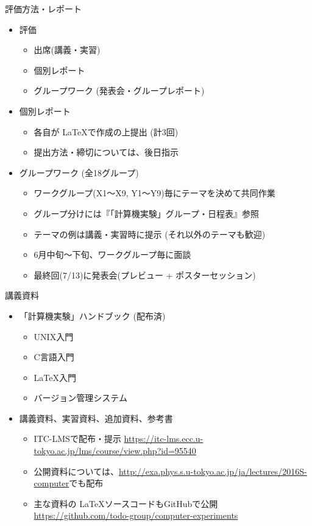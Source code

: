 \documentclass[dvipdfmx]{beamer}
\begin{document}
\begin{frame}[t,fragile]{評価方法・レポート}
  \begin{itemize}
  \item 評価
    \begin{itemize}
    \item 出席(講義・実習)
    \item 個別レポート
    \item グループワーク (発表会・グループレポート)
    \end{itemize}    
  \item 個別レポート
    \begin{itemize}
    \item 各自が \LaTeX で作成の上提出 (計3回)
    \item 提出方法・締切については、後日指示
    \end{itemize}
  \item グループワーク (全18グループ)
    \begin{itemize}
    \item ワークグループ(X1〜X9, Y1〜Y9)毎にテーマを決めて共同作業
    \item グループ分けには『「計算機実験」グループ・日程表』参照
    \item テーマの例は講義・実習時に提示 (それ以外のテーマも歓迎)
    \item 6月中旬〜下旬、ワークグループ毎に面談
    \item 最終回(7/13)に発表会(プレビュー + ポスターセッション)
    \end{itemize}
  \end{itemize}    
\end{frame}

\begin{frame}[t]{講義資料}
  \begin{itemize}
    \setlength{\itemsep}{1em}
  \item 「計算機実験」ハンドブック (配布済)
    \begin{itemize}
    \item UNIX入門
    \item C言語入門
    \item \LaTeX 入門
    \item バージョン管理システム
    \end{itemize}
  \item 講義資料、実習資料、追加資料、参考書
    \begin{itemize}
    \item ITC-LMSで配布・提示 \url{https://itc-lms.ecc.u-tokyo.ac.jp/lms/course/view.php?id=95540}
    \item 公開資料については、\url{http://exa.phys.s.u-tokyo.ac.jp/ja/lectures/2016S-computer}でも配布
    \item 主な資料の \LaTeX ソースコードもGitHubで公開 \\
    {\footnotesize \url{https://github.com/todo-group/computer-experiments}}
    \end{itemize}
  \end{itemize}
\end{frame}
\end{document}
